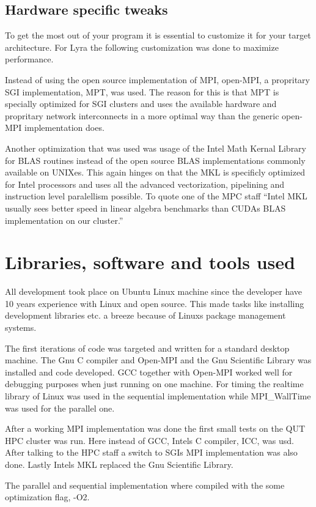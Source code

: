 \documentclass{article}
\begin{document}
\subsection{Hardware specific tweaks}
To get the most out of your program it is essential to customize it for your target architecture.
For Lyra the following customization was done to maximize performance.

Instead of using the open source implementation of MPI, open-MPI, a propritary SGI
implementation, MPT, was used. The reason for this is that MPT is specially optimized
for SGI clusters and uses the available hardware and propritary network interconnects
in a more optimal way than the generic open-MPI implementation does.

Another optimization that was used was usage of the Intel Math Kernal Library\cite{mkl} for
BLAS\cite{blas} routines instead of the open source BLAS implementations commonly available
on UNIXes. This again hinges on that the MKL is specificly optimized for Intel processors
and uses all the advanced vectorization, pipelining and instruction level paralellism
possible. To quote one of the MPC staff ``Intel MKL usually sees better speed in linear
algebra benchmarks than CUDAs BLAS implementation on our cluster.''


\section{Libraries, software and tools used}
All development took place on Ubuntu Linux machine since the developer
have 10 years experience with Linux and open source. This made tasks like
installing development libraries etc. a breeze because of Linuxs package
management systems.

The first iterations of code was targeted and written for a standard
desktop machine. The Gnu C compiler and Open-MPI and the Gnu Scientific Library
was installed and code developed. GCC together with Open-MPI worked well for
debugging purposes when just running on one machine. For timing the realtime
library of Linux was used in the sequential implementation while MPI_WallTime
was used for the parallel one.

After a working MPI implementation was done the first small tests on the
QUT HPC cluster was run. Here instead of GCC, Intels C compiler, ICC, was usd.
After talking to the HPC staff a switch to SGIs MPI implementation was also done.
Lastly Intels MKL replaced the Gnu Scientific Library.

The parallel and sequential implementation where compiled with the some optimization
flag, -O2.
\end{document}

